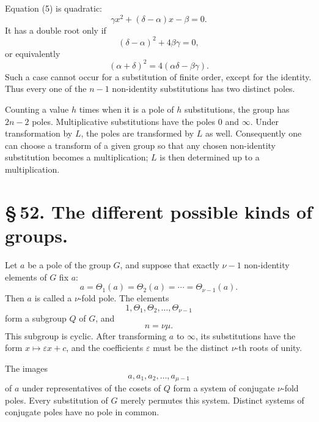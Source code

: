 \documentclass[11pt]{article}
\providecommand{\eps}{\varepsilon}
\providecommand{\eps}{\varepsilon}
\begin{document}
Equation (5) is quadratic:
\begin{equation}
\gamma x^2+(\delta-\alpha)x-\beta=0.
\tag{6}
\end{equation}
It has a double root only if
\begin{equation}
(\delta-\alpha)^2+4\beta\gamma=0,
\tag{7}
\end{equation}
or equivalently
\begin{equation}
(\alpha+\delta)^2=4(\alpha\delta-\beta\gamma).
\tag{8}
\end{equation}
Such a case cannot occur for a substitution of finite order, except for the identity. Thus every one of the $n-1$ non-identity substitutions has two distinct poles.

Counting a value $h$ times when it is a pole of $h$ substitutions, the group has $2n-2$ poles. Multiplicative substitutions have the poles $0$ and $\infty$. Under transformation by $L$, the poles are transformed by $L$ as well. Consequently one can choose a transform of a given group so that any chosen non-identity substitution becomes a multiplication; $L$ is then determined up to a multiplication.

\section*{\S\,52. The different possible kinds of groups.}

Let $a$ be a pole of the group $G$, and suppose that exactly $\nu-1$ non-identity elements of $G$ fix $a$:
\begin{equation}
a=\Theta_1(a)=\Theta_2(a)=\cdots=\Theta_{\nu-1}(a).
\tag{1}
\end{equation}
Then $a$ is called a $\nu$-fold pole. The elements
\begin{equation}
1,\Theta_1,\Theta_2,\ldots,\Theta_{\nu-1}
\tag{2}
\end{equation}
form a subgroup $Q$ of $G$, and
\begin{equation}
n=\nu\mu.
\tag{3}
\end{equation}
This subgroup is cyclic. After transforming $a$ to $\infty$, its substitutions have the form $x\mapsto \eps x+c$, and the coefficients $\eps$ must be the distinct $\nu$-th roots of unity.

The images
\begin{equation}
a,a_1,a_2,\ldots,a_{\mu-1}
\tag{12}
\end{equation}
of $a$ under representatives of the cosets of $Q$ form a system of conjugate $\nu$-fold poles. Every substitution of $G$ merely permutes this system. Distinct systems of conjugate poles have no pole in common.
\end{document}

